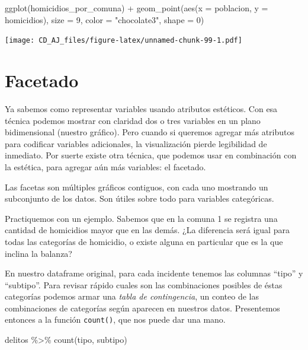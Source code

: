 \documentclass[
]{book}
\newenvironment{Shaded}{\begin{snugshade}}{\end{snugshade}}
\newcommand{\AttributeTok}[1]{\textcolor[rgb]{0.77,0.63,0.00}{#1}}
\newcommand{\DecValTok}[1]{\textcolor[rgb]{0.00,0.00,0.81}{#1}}
\newcommand{\FunctionTok}[1]{\textcolor[rgb]{0.00,0.00,0.00}{#1}}
\newcommand{\NormalTok}[1]{#1}
\newcommand{\SpecialCharTok}[1]{\textcolor[rgb]{0.00,0.00,0.00}{#1}}
\newcommand{\StringTok}[1]{\textcolor[rgb]{0.31,0.60,0.02}{#1}}
\begin{document}
\begin{Shaded}
\begin{Highlighting}[]
\FunctionTok{ggplot}\NormalTok{(homicidios\_por\_comuna) }\SpecialCharTok{+} 
    \FunctionTok{geom\_point}\NormalTok{(}\FunctionTok{aes}\NormalTok{(}\AttributeTok{x =}\NormalTok{ poblacion, }\AttributeTok{y =}\NormalTok{ homicidios), }
               \AttributeTok{size =} \DecValTok{9}\NormalTok{, }\AttributeTok{color =} \StringTok{"chocolate3"}\NormalTok{, }\AttributeTok{shape =} \DecValTok{0}\NormalTok{)}
\end{Highlighting}
\end{Shaded}

\texttt{[image: CD\_AJ\_files/figure-latex/unnamed-chunk-99-1.pdf]}

\hypertarget{facetado}{%
\section{Facetado}\label{facetado}}

Ya sabemos como representar variables usando atributos estéticos. Con esa técnica podemos mostrar con claridad dos o tres variables en un plano bidimensional (nuestro gráfico). Pero cuando si queremos agregar más atributos para codificar variables adicionales, la visualización pierde legibilidad de inmediato. Por suerte existe otra técnica, que podemos usar en combinación con la estética, para agregar aún más variables: el facetado.

Las facetas son múltiples gráficos contiguos, con cada uno mostrando un subconjunto de los datos. Son útiles sobre todo para variables categóricas.

Practiquemos con un ejemplo. Sabemos que en la comuna 1 se registra una cantidad de homicidios mayor que en las demás. ¿La diferencia será igual para todas las categorías de homicidio, o existe alguna en particular que es la que inclina la balanza?

En nuestro dataframe original, para cada incidente tenemos las columnas ``tipo'' y ``subtipo''. Para revisar rápido cuales son las combinaciones posibles de éstas categorías podemos armar una \emph{tabla de contingencia}, un conteo de las combinaciones de categorías según aparecen en nuestros datos. Presentemos entonces a la función \texttt{count()}, que nos puede dar una mano.

\begin{Shaded}
\begin{Highlighting}[]
\NormalTok{delitos }\SpecialCharTok{\%\textgreater{}\%} 
    \FunctionTok{count}\NormalTok{(tipo, subtipo)}
\end{Highlighting}
\end{Shaded}
\end{document}
